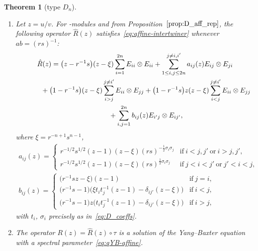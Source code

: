 \documentclass[10pt,a4paper]{amsart}
\numberwithin{equation}{section}
\newtheorem{Theorem}{Theorem}[section]
\newcommand{\sso}{\mathfrak{so}}
\begin{document}
\begin{Theorem}[type $D_{n}$]\label{thm:D_AffRMatrix} \quad
\begin{enumerate}
\item[$(a)$] Let $z = u/v$. For \smash{$U_{r,s}\bigl(\widehat{\sso}_{2n}\bigr)$}-modules  and  from Proposition~$\ref{prop:D_aff_rep}$, the following operator $\hat{R}(z)$ satisfies~\eqref{eq:affine-intertwiner} whenever $ab = (rs)^{-1}$:
\begin{gather}
 \hat{R}(z) =
 \bigl(z - r^{-1}s\bigr)(z - \xi)\sum_{i = 1}^{2n}E_{ii} \otimes E_{ii} + \sum_{1 \le i,j \le 2n}^{j \neq i,i'}a_{ij}(z)E_{ij} \otimes E_{ji} \nonumber\\
 \hphantom{ \hat{R}(z) =}{}
 + \bigl(1 - r^{-1}s\bigr)(z - \xi)\sum_{i > j}^{j \neq i'}E_{ii} \otimes E_{jj} + \bigl(1 - r^{-1}s\bigr)z(z - \xi)\sum_{i < j}^{j \neq i'}E_{ii} \otimes E_{jj} \nonumber\\
 \hphantom{ \hat{R}(z) =}{}
 + \sum_{i,j = 1}^{2n} b_{ij}(z)E_{i'j} \otimes E_{ij'},\label{eq:D_AffRMatrix}
\end{gather}
where $\xi = r^{-n + 1}s^{n - 1}$,
\begin{gather*}
 a_{ij}(z) =
 \begin{cases}
 r^{-1/2}s^{1/2}(z - 1)(z - \xi)(rs)^{-\frac{1}{2}\sigma_{i}\sigma_{j}} &
 \text{if}\ i < j,j'\ \text{or}\ i > j,j', \\
 r^{-1/2}s^{1/2}(z - 1)(z - \xi)(rs)^{\frac{1}{2}\sigma_{i}\sigma_{j}} &
 \text{if}\ j < i < j'\ \text{or}\ j' < i < j,
 \end{cases}
\\
 b_{ij}(z) =
 \begin{cases}
 \bigl(r^{-1}sz - \xi\bigr)(z - 1) & \text{if}\ j = i ,\\
 \bigl(r^{-1}s - 1\bigr)\bigl(\xi t_{i}t_{j}^{-1}(z - 1) - \delta_{ij'}(z - \xi)\bigr) & \text{if}\ i < j ,\\
 \bigl(r^{-1}s - 1\bigr)z\bigl(t_{i}t_{j}^{-1}(z - 1) - \delta_{ij'}(z - \xi)\bigr) & \text{if}\ i > j,
 \end{cases}
\end{gather*}
with $t_{i}$, $\sigma_{i}$ precisely as in~\eqref{eq:D_coeffs}.


\item[$(b)$] The operator $R(z)=\hat{R}(z)\circ \tau$ is a solution of the Yang--Baxter equation with a spectral parameter~\eqref{eq:qYB-affine}.
\end{enumerate}
\end{Theorem}
\end{document}
